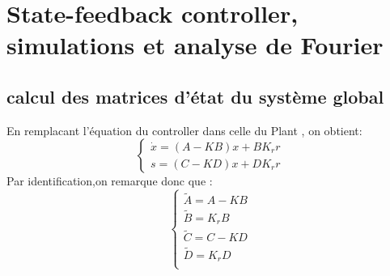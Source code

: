 \documentclass[11pt,a4paper]{article}
\begin{document}
\section{State-feedback controller, simulations et analyse de Fourier}
\subsection{}
\subsection{calcul des matrices d'état du système global}
En remplacant l'équation du controller dans celle du Plant , on obtient:
\begin{equation}
\begin{cases}
\dot x= (A-KB)x+BK_rr \\
s= (C-KD)x+DK_rr
\end{cases}
\end{equation}
Par identification,on remarque donc que : \\
\begin{equation}
\begin{cases}

\tilde{A} = A-KB \\
\tilde{B} = K_rB \\
\tilde{C} = C-KD \\
\tilde{D} = K_rD \\

\end{cases}
\end{equation}
\end{document}
